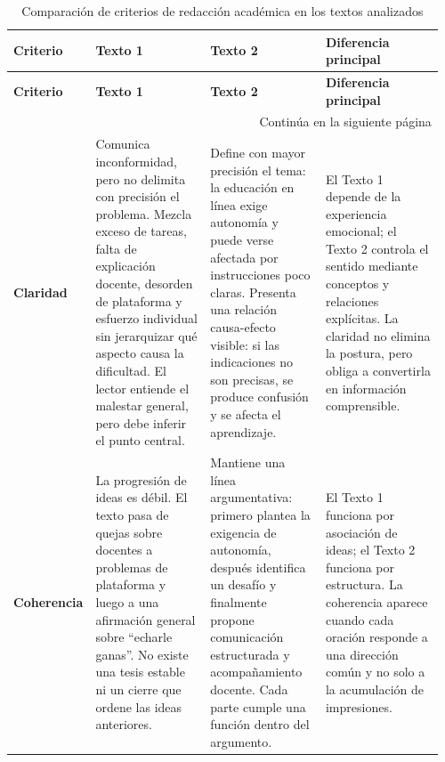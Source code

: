\documentclass[
	spanish, %
	letterpaper, oneside
]{article}
\begin{document}
\clearpage
\pagestyle{empty}
\begin{landscape}
\begingroup
\scriptsize
\setlength{\tabcolsep}{4pt}
\renewcommand{\arraystretch}{1.35}
\begin{longtable}{@{}p{0.14\linewidth}p{0.27\linewidth}p{0.27\linewidth}p{0.28\linewidth}@{}}
\caption{Comparación de criterios de redacción académica en los textos analizados}
\label{tab:comparacion-redaccion-academica}\\
\toprule
\textbf{Criterio} & \textbf{Texto 1} & \textbf{Texto 2} & \textbf{Diferencia principal} \\
\midrule
\endfirsthead
\toprule
\textbf{Criterio} & \textbf{Texto 1} & \textbf{Texto 2} & \textbf{Diferencia principal} \\
\midrule
\endhead
\midrule
\multicolumn{4}{r}{Continúa en la siguiente página} \\
\endfoot
\bottomrule
\endlastfoot

\textbf{Claridad} &
Comunica inconformidad, pero no delimita con precisión el problema. Mezcla exceso de tareas, falta de explicación docente, desorden de plataforma y esfuerzo individual sin jerarquizar qué aspecto causa la dificultad. El lector entiende el malestar general, pero debe inferir el punto central. &
Define con mayor precisión el tema: la educación en línea exige autonomía y puede verse afectada por instrucciones poco claras. Presenta una relación causa-efecto visible: si las indicaciones no son precisas, se produce confusión y se afecta el aprendizaje. &
El Texto 1 depende de la experiencia emocional; el Texto 2 controla el sentido mediante conceptos y relaciones explícitas. La claridad no elimina la postura, pero obliga a convertirla en información comprensible. \\
\midrule

\textbf{Coherencia} &
La progresión de ideas es débil. El texto pasa de quejas sobre docentes a problemas de plataforma y luego a una afirmación general sobre ``echarle ganas''. No existe una tesis estable ni un cierre que ordene las ideas anteriores. &
Mantiene una línea argumentativa: primero plantea la exigencia de autonomía, después identifica un desafío y finalmente propone comunicación estructurada y acompañamiento docente. Cada parte cumple una función dentro del argumento. &
El Texto 1 funciona por asociación de ideas; el Texto 2 funciona por estructura. La coherencia aparece cuando cada oración responde a una dirección común y no solo a la acumulación de impresiones. \\
\midrule


\end{longtable}
\end{landscape}
\end{document}
